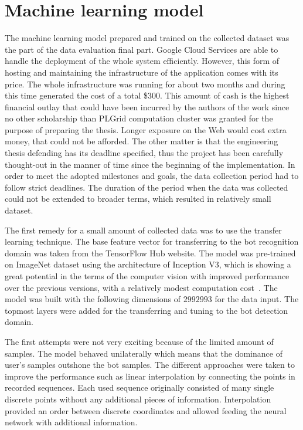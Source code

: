 \section{Machine learning model}\label{sec:machine-learning-model}
The machine learning model prepared and trained on the collected dataset was the part of the data evaluation final part.
Google Cloud Services are able to handle the deployment of the whole system efficiently.
However, this form of hosting and maintaining the infrastructure of the application comes with its price.
The whole infrastructure was running for about two months and during this time generated the cost of a total \$300.
This amount of cash is the highest financial outlay that could have been incurred by the authors of the work since no other scholarship than PLGrid computation cluster was granted for the purpose of preparing the thesis.
Longer exposure on the Web would cost extra money, that could not be afforded.
The other matter is that the engineering thesis defending has its deadline specified, thus the project has been carefully thought-out in the manner of time since the beginning of the implementation.
In order to meet the adopted milestones and goals, the data collection period had to follow strict deadlines.
The duration of the period when the data was collected could not be extended to broader terms, which resulted in relatively small dataset.

The first remedy for a small amount of collected data was to use the transfer learning technique.
The base feature vector for transferring to the bot recognition domain was taken from the TensorFlow Hub website.
The model was pre-trained on ImageNet dataset using the architecture of Inception V3, which is showing a great potential in the terms of the computer vision with improved performance over the previous versions, with a relatively modest computation cost~\cite{inception-v3}.
The model was built with the following dimensions of $299$\texttimes$299$\texttimes$3$ for the data input.
The topmost layers were added for the transferring and tuning to the bot detection domain.

The first attempts were not very exciting because of the limited amount of samples.
The model behaved unilaterally which means that the dominance of user's samples outshone the bot samples.
The different approaches were taken to improve the performance such as linear interpolation by connecting the points in recorded sequences.
Each used sequence originally consisted of many single discrete points without any additional pieces of information.
Interpolation provided an order between discrete coordinates and allowed feeding the neural network with additional information.

